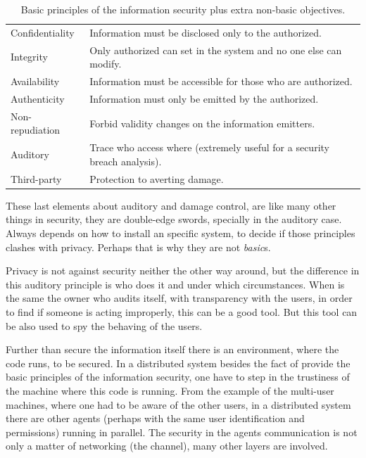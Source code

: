 \documentclass[10pt,a4paper,twoside]{llncs}
\begin{document}
\begin{table}[h]
    \begin{center}
        \begin{tabular}{|l|l|}
            \hline
            Confidentiality & Information must be disclosed only to the authorized. \\
            Integrity & Only authorized can set in the system and no one else can modify. \\
            Availability & Information must be accessible for those who are authorized. \\
            Authenticity & Information must only be emitted by the authorized. \\
            Non-repudiation & Forbid validity changes on the information emitters. \\
            \hline
            Auditory & Trace who access where (extremely useful for a security breach analysis). \\
            Third-party & Protection to averting damage. \\
            \hline
        \end{tabular}
        \caption{Basic principles of the information security plus extra non-basic objectives.}\label{tab:infosec}
    \end{center}
\end{table}

These last elements about auditory and damage control, are like many other things in security, they are double-edge swords, specially in the auditory case. Always depends on how to install an specific system, to decide if those principles clashes with privacy. Perhaps that is why they are not \emph{basic}s. 

Privacy is not against security neither the other way around, but the difference in this auditory principle is who does it and under which circumstances. When is the same the owner who audits itself, with transparency with the users, in order to find if someone is acting improperly, this can be a good tool. But this tool can be also used to spy the behaving of the users.

Further than secure the information itself there is an environment, where the code runs, to be secured. In a distributed system besides the fact of provide the basic principles of the information security, one have to step in the trustiness of the machine where this code is running. From the example of the multi-user machines, where one had to be aware of the other users, in a distributed system there are other agents (perhaps with the same user identification and permissions) running in parallel. The security in the agents communication is not only a matter of networking (the channel), many other layers are involved.
\end{document}
